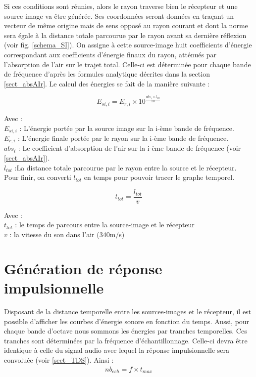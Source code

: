 Si ces conditions sont réunies, alors le rayon traverse bien le récepteur et une source image va être générée. Ses coordonnées seront données en traçant un vecteur de même origine mais de sens opposé au rayon courant et dont la norme sera égale à la distance totale parcourue par le rayon avant sa dernière réflexion (voir fig. \ref{schema_SI}). On assigne à cette source-image huit coefficients d'énergie correspondant aux coefficients d'énergie finaux du rayon, atténués par l'absorption de l'air sur le trajet total. Celle-ci est déterminée pour chaque bande de fréquence d'après les formules analytique décrites dans la section \ref{sect_absAIr}. Le calcul des énergies se fait de la manière suivante :

\begin{equation}
E_{si, i} = E_{r, i} \times 10^{\frac{abs_i \times l_{tot} }{10}}
\end{equation}

Avec : \\
$E_{si, i}$ : L'énergie portée par la source image sur la i-ème bande de fréquence. \\
$E_{r, i}$ : L'énergie finale portée par le rayon sur la i-ème bande de fréquence. \\
$abs_i$ : Le coefficient d'absorption de l'air sur la i-ème bande de fréquence (voir \ref{sect_absAIr}). \\
$ l_{tot}$ :La distance totale parcourue par le rayon entre la source et le récepteur. \\

Pour finir, on converti  $l_{tot}$ en temps pour pouvoir tracer le graphe temporel.

\begin{equation}
 t_{tot} =  \frac{l_{tot}}{v}
\end{equation}

Avec : \\
$ t_{tot}$ : le temps de parcours entre la source-image et le récepteur \\
$v$ : la vitesse du son dans l'air (340m/s)



\section{Génération de réponse impulsionnelle} \label{sect_rir}

Disposant de la distance temporelle entre les sources-images et le récepteur, il est possible d'afficher les courbes d'énergie sonore en fonction du temps. Aussi, pour chaque bande d'octave nous sommons les énergies par tranches temporelles. Ces tranches sont déterminées par la fréquence d'échantillonnage. Celle-ci devra être identique à celle du signal audio avec lequel la réponse impulsionnelle sera convoluée (voir \ref{sect_TDS}). Ainsi :
\begin{align}
nb_{ech} = f \times t_{max} 
\end{align}

